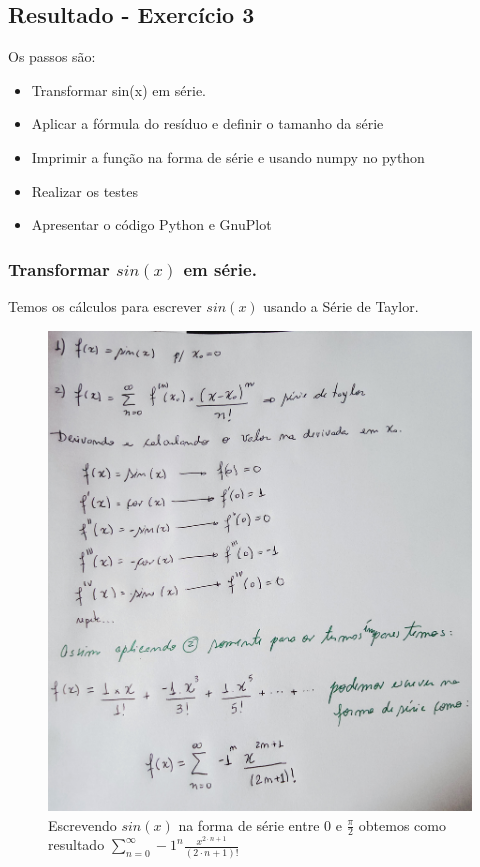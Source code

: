 \subsection{Resultado - Exercício 3}

Os passos são:
\begin{itemize}[leftmargin=3.5em, itemsep=-.5mm, topsep=0.5mm]
    \item Transformar sin(x) em série.
    \item Aplicar a fórmula do resíduo e definir o tamanho da série
    \item Imprimir a função na forma de série e usando numpy no python
    \item Realizar os testes
    \item Apresentar o código Python e GnuPlot
 \end{itemize}

\subsubsection{Transformar $sin(x)$ em série.}
Temos os cálculos para escrever $sin(x)$ usando a Série de Taylor.
\begin{figure}[H]
    \centering
    \includegraphics[width=.46\textwidth]{imagens/exercicio3_parte_1}
    \caption{Escrevendo $sin(x)$ na forma de série entre $0$ e $\frac{\pi}{2}$ obtemos como resultado $\sum_{n=0}^{\infty} -1^n \frac{x^{2 \cdot n + 1}}{(2 \cdot n + 1)!} $}
    \label{fig:lista_exercicio3_parte1}
\end{figure}
\newpage

